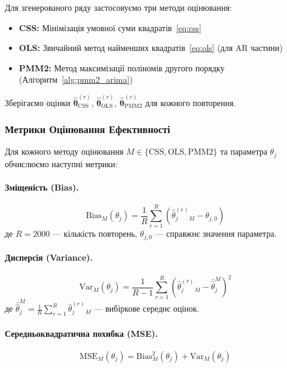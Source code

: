 \documentclass[12pt,a4paper]{article}
\begin{document}
	Для згенерованого ряду застосовуємо три методи оцінювання:
	\begin{itemize}
		\item \textbf{CSS:} Мінімізація умовної суми квадратів~\eqref{eq:css}
		\item \textbf{OLS:} Звичайний метод найменших квадратів~\eqref{eq:ols} (для AR частини)
		\item \textbf{PMM2:} Метод максимізації поліномів другого порядку (Алгоритм~\ref{alg:pmm2_arima})
	\end{itemize}
	
	Зберігаємо оцінки $\hat{\boldsymbol{\theta}}^{(r)}_{\text{CSS}}$, $\hat{\boldsymbol{\theta}}^{(r)}_{\text{OLS}}$, $\hat{\boldsymbol{\theta}}^{(r)}_{\text{PMM2}}$ для кожного повторення.
	
	\subsubsection{Метрики Оцінювання Ефективності}
	
	Для кожного методу оцінювання $M \in \{\text{CSS}, \text{OLS}, \text{PMM2}\}$ та параметра $\theta_j$ обчислюємо наступні метрики:
	
	\paragraph{Зміщеність (Bias).}
	\begin{equation}
		\label{eq:bias}
		\text{Bias}_M(\theta_j) = \frac{1}{R} \sum_{r=1}^{R} \left( \hat{\theta}_j^{(r)}_M - \theta_{j,0} \right)
	\end{equation}
	де $R = 2000$ --- кількість повторень, $\theta_{j,0}$ --- справжнє значення параметра.
	
	\paragraph{Дисперсія (Variance).}
	\begin{equation}
		\label{eq:variance}
		\text{Var}_M(\theta_j) = \frac{1}{R-1} \sum_{r=1}^{R} \left( \hat{\theta}_j^{(r)}_M - \bar{\hat{\theta}}_j^M \right)^2
	\end{equation}
	де $\bar{\hat{\theta}}_j^M = \frac{1}{R} \sum_{r=1}^{R} \hat{\theta}_j^{(r)}_M$ --- вибіркове середнє оцінок.
	
	\paragraph{Середньоквадратична похибка (MSE).}
	\begin{equation}
		\label{eq:mse}
		\text{MSE}_M(\theta_j) = \text{Bias}_M^2(\theta_j) + \text{Var}_M(\theta_j)
	\end{equation}
	
\end{document}
